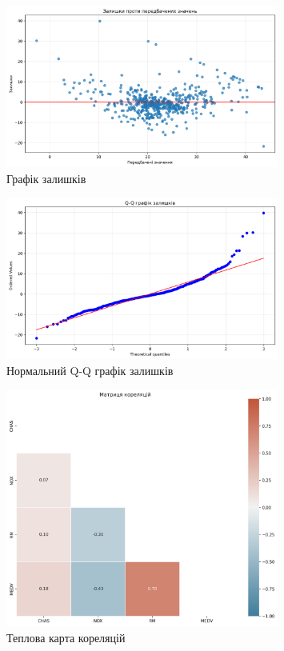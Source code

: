 \documentclass[12pt,a4paper]{article}
\begin{document}
\vspace{0.5cm}

\begin{figure}[H]
    \centering
    \includegraphics[width=0.8\textwidth]{residuals.png}
    \caption{Графік залишків}
    \label{fig:графік_залишків}
\end{figure}

\vspace{0.5cm}

\begin{figure}[H]
    \centering
    \includegraphics[width=0.8\textwidth]{qq_plot.png}
    \caption{Нормальний Q-Q графік залишків}
    \label{fig:нормальний_q-q_графік_залишків}
\end{figure}

\vspace{0.5cm}

\begin{figure}[H]
    \centering
    \includegraphics[width=0.8\textwidth]{correlation_heatmap.png}
    \caption{Теплова карта кореляцій}
    \label{fig:теплова_карта_кореляцій}
\end{figure}
\end{document}
